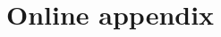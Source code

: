 \documentclass[11pt, a4paper]{article}
\begin{document}
    
\setcounter{page}{1}
\appendix
\section{Online appendix}\label{sec:appendix}
\end{document}
